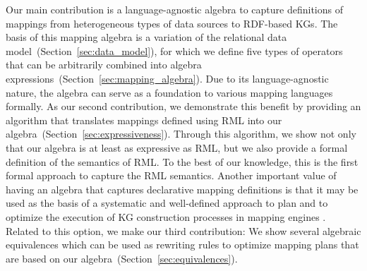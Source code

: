 Our main contribution is a language-agnostic algebra to capture definitions of mappings from heterogeneous types of data sources to RDF-based KGs. The basis of this mapping algebra is a variation of the relational data model~(Section~\ref{sec:data_model}), for which we define five types of operators that can be arbitrarily combined into algebra expressions~(Section~\ref{sec:mapping_algebra}).
%
Due to its language-agnostic nature, the algebra can serve as a foundation to
various mapping languages formally. As our second contribution, we demonstrate this benefit by providing an algorithm that translates mappings defined using RML into our algebra~(Section~\ref{sec:expressiveness}). Through this algorithm, we show not only that our algebra is at least as expressive as RML, but we also provide a formal definition of the semantics of RML. To the best of our knowledge, this is the first formal approach to capture the RML semantics.
%
Another important value of having an algebra that captures declarative mapping definitions is that
	it
may be used as the basis of a systematic and well-defined approach to plan and to optimize
	the execution of
%
	KG construction processes
in mapping engines%
.
Related to this option, we make our third contribution: We show several algebraic
	equivalences which can be used as rewriting rules
to optimize mapping plans that are based on our algebra~(Section~\ref{sec:equivalences}).




